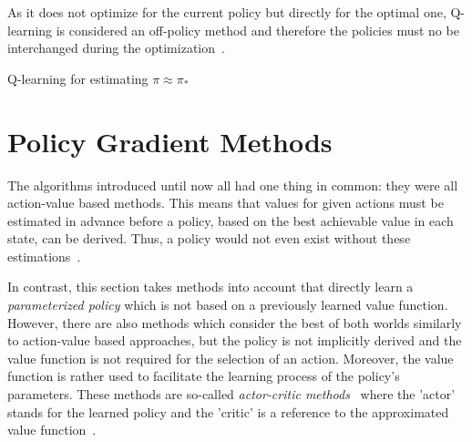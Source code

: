 \documentclass[draft,final]{vutinfth} %
\newcommand{\p}[1]{see p. #1}
\begin{document}
    As it does not optimize for the current policy but directly for the optimal one, Q-learning is considered an off-policy method and therefore the policies must no be interchanged during the optimization~\citep[\p{57}]{szepesvari_algorithms_2010}.

    \begin{algorithm}
        \caption[Q-learning for estimating $\pi \approx \pi_*$]{Q-learning for estimating $\pi \approx \pi_*$\protect\footnotemark}
        \label{alg:q_learning}

        \KwIn{Step size $\alpha \in (0,1]$, small $\epsilon > 0$}
        \;



    \end{algorithm}

    \footnotetext{\citep[\p{131}]{sutton_reinforcement_2018}}


    \section{Policy Gradient Methods}\label{sec:policy-gradient-methods}
    The algorithms introduced until now all had one thing in common: they were all action-value based methods.
    This means that values for given actions must be estimated in advance before a policy, based on the best achievable value in each state, can be derived.
    Thus, a policy would not even exist without these estimations~\citep[\p{321}]{sutton_reinforcement_2018}.

    In contrast, this section takes methods into account that directly learn a \textit{parameterized policy} which is not based on a previously learned value function.
    However, there are also methods which consider the best of both worlds similarly to action-value based approaches, but the policy is not implicitly derived and the value function is not required for the selection of an action.
    Moreover, the value function is rather used to facilitate the learning process of the policy's parameters.
    These methods are so-called \textit{actor-critic methods}~ where the 'actor' stands for the learned policy and the 'critic' is a reference to the approximated value function~\citep[\p{321}]{sutton_reinforcement_2018}.
\end{document}
